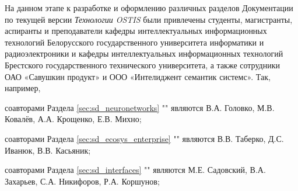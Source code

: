 \begin{SCn}
{На данном этапе к разработке и оформлению различных разделов Документации по текущей версии \textit{Технологии OSTIS} были привлечены студенты, магистранты, аспиранты и преподаватели кафедры интеллектуальных информационных технологий Белорусского государственного университета информатики и радиоэлектроники и кафедры интеллектуальных информационных технологий Брестского государственного технического университета, а также сотрудники ОАО «Савушкин продукт» и ООО «Интелиджент семантик системс». Так, например,
\begin{scnitemize}
\item соавторами Раздела \ref{sec:sd_neuronetworks} ""{} являются В.А. Головко, М.В. Ковалёв, А.А. Крощенко, Е.В. Михно;
\item соавторами Раздела \ref{sec:sd_ecosys_enterprise} ""{} являются В.В. Таберко, Д.С. Иванюк, В.В. Касьяник;
\item соавторами Раздела \ref{sec:sd_interfaces} ""{} являются М.Е. Садовский, В.А. Захарьев, С.А. Никифоров, Р.А. Коршунов;
\end{scnitemize}
}


\scnendstruct

\end{SCn}
